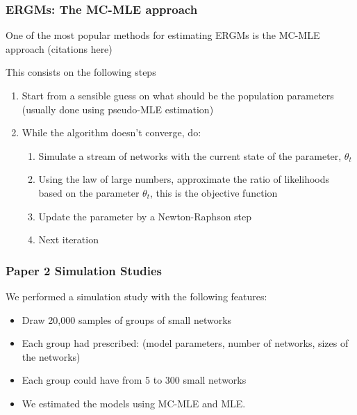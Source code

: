 \documentclass[aspectratio=169, 9pt, handout]{beamer}
\begin{document}
\begin{frame}[label=mcmle]
\frametitle{ERGMs: The MC-MLE approach}

One of the most popular methods for estimating ERGMs is the MC-MLE approach (citations here)

This consists on the following steps

\begin{enumerate}
\item Start from a sensible guess on what should be the population parameters
(usually done using pseudo-MLE estimation)
\item While the algorithm doesn't converge, do:
  \begin{enumerate}
  \item Simulate a stream of networks with the current state of the parameter,
  $\theta_t$
  \item Using the law of large numbers, approximate the ratio of likelihoods 
  based on the parameter $\theta_t$, this is the objective function
  \item Update the parameter by a Newton-Raphson step
  \item Next iteration
  \end{enumerate}
\end{enumerate}

\vfill\hfill \hyperlink{art}{}


\end{frame}



\begin{frame}[label=ergmitodgp]
\frametitle{Paper 2 Simulation Studies}

We performed a simulation study with the following features:

\begin{itemize}%
\item Draw 20,000 samples of groups of small networks
\item Each group had prescribed: (model parameters, number of networks, sizes of the networks)
\item Each group could have from 5 to 300 small networks
\item We estimated the models using MC-MLE and MLE.
\end{itemize}

\vfill\hfill\hyperlink{ergmitoexample}{}

\end{frame}
\end{document}
